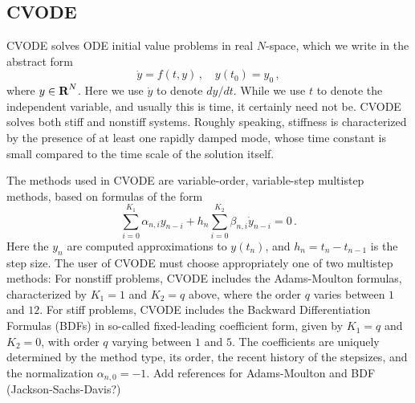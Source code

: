 \subsection{CVODE}\label{ss:cvode}

CVODE solves ODE initial value problems in real $N$-space, which we
write in the abstract form
\begin{equation}\label{ODE} 
  \dot{y} = f(t,y) \, ,\quad y(t_0) = y_0 \, ,
\end{equation}
where $y \in \mbox{\bf R}^N$.
Here we use $\dot{y}$ to denote $dy/dt$.  While we use $t$ to denote
the independent variable, and usually this is time, it certainly need
not be.  CVODE solves both stiff and nonstiff systems.  Roughly
speaking, stiffness is characterized by the presence of at least one
rapidly damped mode, whose time constant is small compared to the time
scale of the solution itself.

The methods used in CVODE are variable-order, variable-step multistep
methods, based on formulas of the form
\begin{equation}\label{LMM} 
 \sum_{i = 0}^{K_1} \alpha_{n,i} y_{n-i} + 
     h_n \sum_{i = 0}^{K_2} \beta_{n,i} \dot{y}_{n-i} = 0 \, .
\end{equation}
Here the $y_n$ are computed approximations to $y(t_n)$, and
$h_n = t_n - t_{n-1}$ is the step size.  The user of CVODE must choose
appropriately one of two multistep methods: For nonstiff problems,
CVODE includes the Adams-Moulton formulas, characterized by $K_1 = 1$
and $K_2 = q$ above, where the order $q$ varies between $1$ and $12$.
For stiff problems, CVODE includes the Backward Differentiation
Formulas (BDFs) in so-called fixed-leading coefficient form, given by
$K_1 = q$ and $K_2 = 0$, with order $q$ varying between $1$ and $5$.
The coefficients are uniquely determined by the method type, its
order, the recent history of the stepsizes, and the normalization
$\alpha_{n,0} = -1$.
{\sf Add references for Adams-Moulton and BDF (Jackson-Sachs-Davis?)}

